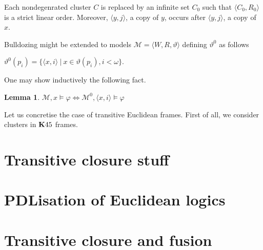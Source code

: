 \documentclass[a4paper]{article}
\theoremstyle{defin}
\theoremstyle{theorem}
\theoremstyle{prop}
\theoremstyle{lemma}
\newtheorem{lemma}{Lemma}
\theoremstyle{ex}
\theoremstyle{col}
\begin{document}
Each nondegenrated cluster $C$ is replaced by an infinite set $C_0$ such that $\langle C_0, R_0 \rangle$ is a strict linear order. Moreover, $\langle y, j \rangle$, a copy of $y$, occurs after $\langle y, j \rangle$, a copy of $x$.

Bulldozing might be extended to models $\mathcal{M} = \langle W, R, \vartheta \rangle$ defining $\vartheta^0$ as follows
\begin{center}
  $\vartheta^{0}(p_i) = \{ \langle x, i \rangle \: | \: x \in \vartheta(p_i), i < \omega \}$.
\end{center}

One may show inductively the following fact.
\begin{lemma}
  $\mathcal{M}, x \models \varphi \Leftrightarrow \mathcal{M}^{0}, \langle x, i \rangle \models \varphi$
\end{lemma}

Let us concretise the case of transitive Euclidean frames. First of all, we consider clusters in ${\bf K}45$ frames.

\section{Transitive closure stuff}

\section{PDLisation of Euclidean logics}

\section{Transitive closure and fusion}



\end{document}
